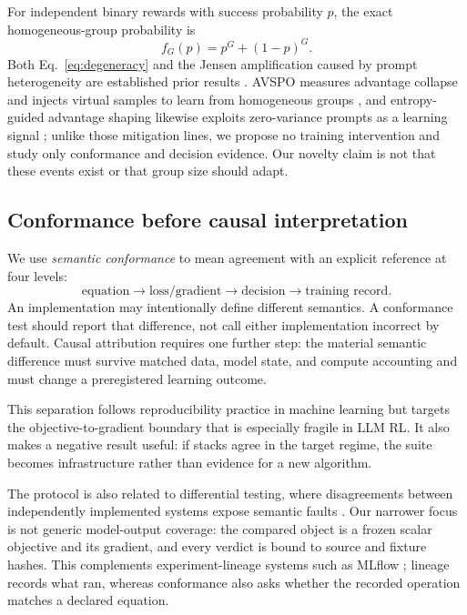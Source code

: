 \documentclass{article}
\begin{document}
For independent binary rewards with success probability $p$, the exact
homogeneous-group probability is
\begin{equation}
  f_G(p)=p^G+(1-p)^G.
  \label{eq:degeneracy}
\end{equation}
Both Eq.~\eqref{eq:degeneracy} and the Jensen amplification caused by prompt
heterogeneity are established prior results \citep{nie2026gradient}.  AVSPO
measures advantage collapse and injects virtual samples to learn from
homogeneous groups \citep{he2026advantage}, and entropy-guided advantage
shaping likewise exploits zero-variance prompts as a learning signal
\citep{le2025noprompt}; unlike those mitigation lines, we propose no
training intervention and study only conformance and decision evidence.
Our novelty claim is not that these events exist or that group size should
adapt.

\subsection{Conformance before causal interpretation}

We use \emph{semantic conformance} to mean agreement with an explicit reference
at four levels:
\begin{equation}
  \text{equation}\longrightarrow\text{loss/gradient}
  \longrightarrow\text{decision}\longrightarrow\text{training record}.
  \label{eq:chain}
\end{equation}
An implementation may intentionally define different semantics.  A conformance
test should report that difference, not call either implementation incorrect by
default.  Causal attribution requires one further step: the material semantic
difference must survive matched data, model state, and compute accounting and
must change a preregistered learning outcome.

This separation follows reproducibility practice in machine learning
\citep{pineau2021reproducibility} but targets the objective-to-gradient boundary
that is especially fragile in LLM RL.  It also makes a negative result useful:
if stacks agree in the target regime, the suite becomes infrastructure rather
than evidence for a new algorithm.

The protocol is also related to differential testing, where disagreements
between independently implemented systems expose semantic faults
\citep{pei2017deepxplore}.  Our narrower focus is not generic model-output
coverage: the compared object is a frozen scalar objective and its gradient,
and every verdict is bound to source and fixture hashes.  This complements
experiment-lineage systems such as MLflow \citep{zaharia2018mlflow}; lineage
records what ran, whereas conformance also asks whether the recorded operation
matches a declared equation.
\end{document}
